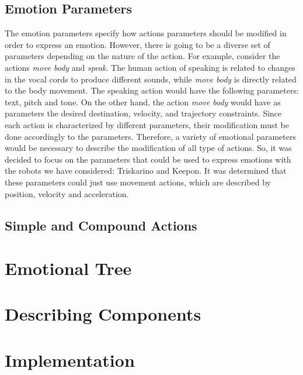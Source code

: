 \documentclass[letterpaper, 10 pt, conference]{ieeeconf}  %
\begin{document}
\subsection{Emotion Parameters}
The emotion parameters specify how actions parameters should be modified in order to express an emotion. However, there is going to be a diverse set of parameters depending on the nature of the action. For example, consider the actions \textit{move body} and \textit{speak}. The human action of speaking is related to changes in the vocal cords to produce different sounds, while \textit{move body} is directly related to the body movement. The speaking action would have the following parameters: text, pitch and tone. On the other hand, the action \textit{move body} would have as parameters the desired destination, velocity, and trajectory constraints. Since each action is characterized by different parameters, their modification must be done accordingly to the parameters. Therefore, a variety of emotional parameters would be necessary to describe the modification of all type of actions. So, it was decided to focus on the parameters that could be used to express emotions with the robots we have considered: Triskarino and Keepon. It was determined that these parameters could just use movement actions, which are described by position, velocity and acceleration.    
\subsection{Simple and Compound Actions}
 
\section{Emotional Tree}
\label{sec:emotional_execution_tree}

\section{Describing Components}
\label{sec:description}

\section{Implementation}
\label{sec:implementation}

\end{document}
